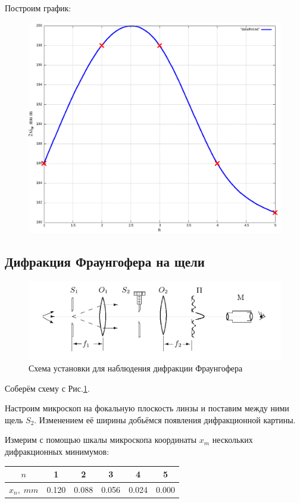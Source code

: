 \documentclass{article}
\begin{document}
Построим график:
\begin{figure}[H]
  \centering
  \includegraphics[width=\textwidth]{frnl.png}
\end{figure}

\subsection{Дифракция Фраунгофера на щели}
\begin{figure}[H]
  \centering
  \includegraphics[width=\textwidth]{fgfr-scheme.png}
  \caption{Схема установки для наблюдения дифракции Фраунгофера}
  \label{fig:fgfr}
\end{figure}

Соберём схему с Рис.\ref{fig:fgfr}.

Настроим микроскоп на фокальную плоскость линзы и поставим между ними щель \(S_2\).
Изменением её ширины добьёмся появления дифракционной картины.

Измерим с помощью шкалы микроскопа координаты \(x_m\) нескольких дифракционных минимумов:

\begin{table}[H]
  \centering
  \begin{tabular}{|c|c|c|c|c|c|}
    \hline
   \(n\)           &  1    & 2     &  3    &  4    &  5    \\\hline
   \(x_n,\;mm\)    & 0.120 & 0.088 & 0.056 & 0.024 & 0.000 \\\hline
  \end{tabular}
\end{table}
\end{document}

